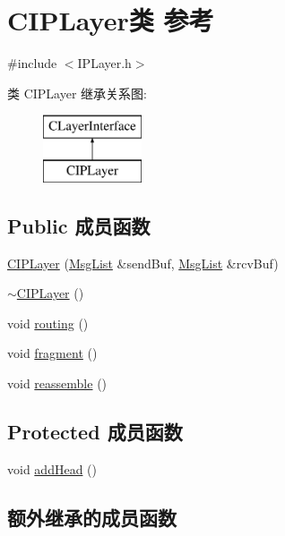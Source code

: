 \hypertarget{class_c_i_p_layer}{}\section{C\+I\+P\+Layer类 参考}
\label{class_c_i_p_layer}


{\ttfamily \#include $<$I\+P\+Layer.\+h$>$}

类 C\+I\+P\+Layer 继承关系图\+:\begin{figure}[H]
\begin{center}
\leavevmode
\includegraphics[height=2.000000cm]{class_c_i_p_layer}
\end{center}
\end{figure}
\subsection*{Public 成员函数}
\begin{DoxyCompactItemize}
\item 
\hyperlink{class_c_i_p_layer_a29f18d33abf037633c2dce2ed727ca5e}{C\+I\+P\+Layer} (\hyperlink{class_msg_list}{Msg\+List} \&send\+Buf, \hyperlink{class_msg_list}{Msg\+List} \&rcv\+Buf)
\item 
\hyperlink{class_c_i_p_layer_a064dc4bd7137c3c1a509ff3b9f23765a}{$\sim$\+C\+I\+P\+Layer} ()
\item 
void \hyperlink{class_c_i_p_layer_afe758e9d359f9318a026ac89672b4b21}{routing} ()
\item 
void \hyperlink{class_c_i_p_layer_a85c7f675704b8605eb16e881abdcca1d}{fragment} ()
\item 
void \hyperlink{class_c_i_p_layer_a68cfe267fa5138e11051d746540ae714}{reassemble} ()
\end{DoxyCompactItemize}
\subsection*{Protected 成员函数}
\begin{DoxyCompactItemize}
\item 
void \hyperlink{class_c_i_p_layer_a4a73e335cc0801fe2a7f0de6ab955411}{add\+Head} ()
\end{DoxyCompactItemize}
\subsection*{额外继承的成员函数}


